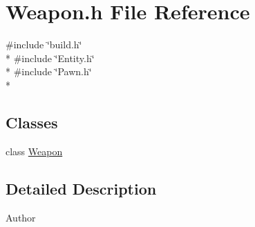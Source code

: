 \section{Weapon.\-h File Reference}
\label{_weapon_8h}
{\ttfamily \#include \char`\"{}build.\-h\char`\"{}}\\*
{\ttfamily \#include \char`\"{}Entity.\-h\char`\"{}}\\*
{\ttfamily \#include \char`\"{}Pawn.\-h\char`\"{}}\\*
\subsection*{Classes}
\begin{DoxyCompactItemize}
\item 
class \hyperlink{class_weapon}{Weapon}
\end{DoxyCompactItemize}


\subsection{Detailed Description}
\begin{DoxyAuthor}{Author}

\end{DoxyAuthor}
